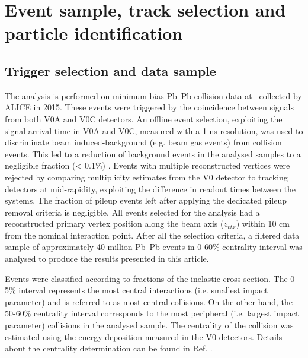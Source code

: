 \newpage
\section{Event sample, track selection and particle identification}
\label{Sec:EventTrackIdentification}
\subsection{Trigger selection and data sample}
\label{SubSec:Event}
The analysis is performed on minimum bias Pb--Pb collision data at \sNN~collected by ALICE in 2015. These events were triggered by the coincidence between signals from both V0A and V0C detectors. An offline event selection, exploiting the signal arrival time in V0A and V0C, measured with a 1 ns resolution, was used to discriminate beam induced-background (e.g. beam gas events) from collision events. This led to a reduction of background events in the analysed samples to a negligible fraction (< 0.1\%) \cite{Abelev:2014ffa}. Events with multiple reconstructed vertices were rejected by comparing multiplicity estimates from the V0 detector to tracking detectors at mid-rapidity, exploiting the difference in readout times between the systems. The fraction of pileup events left after applying the dedicated pileup removal criteria is negligible. All events selected for the analysis had a reconstructed primary vertex position along the beam axis ($z_{vtx}$) within 10 cm from the nominal interaction point. After all the selection criteria, a filtered data sample of approximately 40 million Pb--Pb events in 0-60\% centrality interval was analysed to produce the results presented in this article.

Events were classified according to fractions of the inelastic cross section. The 0-5\% interval represents the most central interactions (i.e. smallest impact parameter) and is referred to as most central collisions. On the other hand, the 50-60\% centrality interval corresponds to the most peripheral (i.e. largest impact parameter) collisions in the analysed sample. The centrality of the collision was estimated using the energy deposition measured in the V0 detectors. Details about the centrality determination can be found in Ref. \cite{Abelev:2013qoq}.



